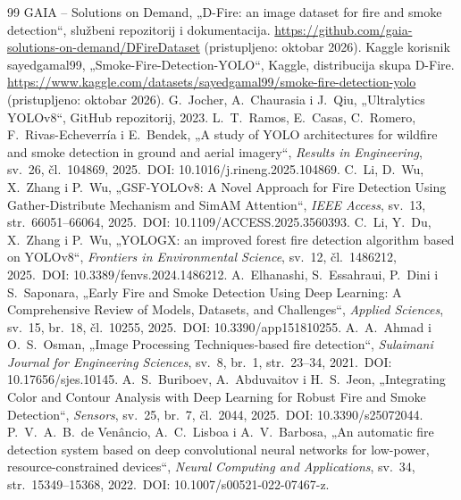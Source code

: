 \documentclass[11pt,a4paper]{article}
\begin{document}
\clearpage
{}
\begin{thebibliography}{99}
\small
{} GAIA -- Solutions on Demand, „D-Fire: an image dataset for fire and smoke detection“, službeni repozitorij i dokumentacija. \url{https://github.com/gaia-solutions-on-demand/DFireDataset} (pristupljeno: oktobar 2026).
 Kaggle korisnik sayedgamal99, „Smoke-Fire-Detection-YOLO“, Kaggle, distribucija skupa D-Fire. \url{https://www.kaggle.com/datasets/sayedgamal99/smoke-fire-detection-yolo} (pristupljeno: oktobar 2026).
 G.\ Jocher, A.\ Chaurasia i J.\ Qiu, „Ultralytics YOLOv8“, GitHub repozitorij, 2023.
 L.\ T.\ Ramos, E.\ Casas, C.\ Romero, F.\ Rivas-Echeverría i E.\ Bendek, „A study of YOLO architectures for wildfire and smoke detection in ground and aerial imagery“, \emph{Results in Engineering}, sv.\ 26, čl.\ 104869, 2025.\ DOI: 10.1016/j.rineng.2025.104869.
 C.\ Li, D.\ Wu, X.\ Zhang i P.\ Wu, „GSF-YOLOv8: A Novel Approach for Fire Detection Using Gather-Distribute Mechanism and SimAM Attention“, \emph{IEEE Access}, sv.\ 13, str.\ 66051--66064, 2025.\ DOI: 10.1109/ACCESS.2025.3560393.
 C.\ Li, Y.\ Du, X.\ Zhang i P.\ Wu, „YOLOGX: an improved forest fire detection algorithm based on YOLOv8“, \emph{Frontiers in Environmental Science}, sv.\ 12, čl.\ 1486212, 2025.\ DOI: 10.3389/fenvs.2024.1486212.
 A.\ Elhanashi, S.\ Essahraui, P.\ Dini i S.\ Saponara, „Early Fire and Smoke Detection Using Deep Learning: A Comprehensive Review of Models, Datasets, and Challenges“, \emph{Applied Sciences}, sv.\ 15, br.\ 18, čl.\ 10255, 2025.\ DOI: 10.3390/app151810255.
 A.\ A.\ Ahmad i O.\ S.\ Osman, „Image Processing Techniques-based fire detection“, \emph{Sulaimani Journal for Engineering Sciences}, sv.\ 8, br.\ 1, str.\ 23--34, 2021.\ DOI: 10.17656/sjes.10145.
 A.\ S.\ Buriboev, A.\ Abduvaitov i H.\ S.\ Jeon, „Integrating Color and Contour Analysis with Deep Learning for Robust Fire and Smoke Detection“, \emph{Sensors}, sv.\ 25, br.\ 7, čl.\ 2044, 2025.\ DOI: 10.3390/s25072044.
 P.\ V.\ A.\ B.\ de Venâncio, A.\ C.\ Lisboa i A.\ V.\ Barbosa, „An automatic fire detection system based on deep convolutional neural networks for low-power, resource-constrained devices“, \emph{Neural Computing and Applications}, sv.\ 34, str.\ 15349--15368, 2022.\ DOI: 10.1007/s00521-022-07467-z.
\end{thebibliography}
\end{document}
